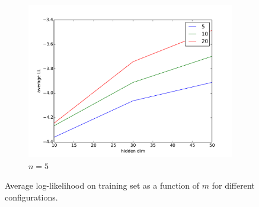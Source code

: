 \documentclass[psamsfonts]{amsart}
\theoremstyle{definition}
\theoremstyle{remark}
\numberwithin{equation}{section}
\begin{document}
\begin{figure}
\begin{subfigure}[b]{0.3\textwidth}
		\includegraphics[width=\textwidth]{code/hw1_train_n5.pdf}
		\caption{$n=5$}
	\end{subfigure}
	\caption{Average log-likelihood on training set as a function of $m$ for different configurations.}
\end{figure}
\end{document}
